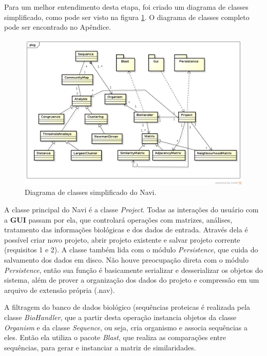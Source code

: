Para um melhor entendimento desta etapa, foi criado um diagrama de classes simplificado, como pode ser visto na figura \ref{fig:diagrama-classes-simplificado}.
O diagrama de classes completo pode ser encontrado no Apêndice.

\begin{figure}
\centering
\includegraphics[scale=0.52]{diagrama-classes-simplificado}
\caption{Diagrama de classes simplificado do Navi.}
\label{fig:diagrama-classes-simplificado}
\end{figure}

A classe principal do Navi é a classe \textit{Project}. Todas as interações do usuário com a \textbf{GUI} passam por ela, que controlará operações com
matrizes, análises, tratamento das informações biológicas e dos dados de entrada. Através dela é possível criar novo projeto, abrir projeto existente e
salvar projeto corrente (requisitos 1 e 2). A classe também lida com o módulo \textit{Persistence}, que cuida do salvamento dos dados em disco. Não houve
preocupação direta com o módulo \textit{Persistence}, então sua função é basicamente serializar e desserializar os objetos do sistema, além de prover
a organização dos dados do projeto e compressão em um arquivo de extensão própria (.nav).


A filtragem do banco de dados biológico (sequências proteicas é realizada pela classe \textit{BioHandler}, que a partir desta operação instancia objetos
da classe \textit{Organism} e da classe \textit{Sequence}, ou seja, cria organismo e associa sequências a eles. Então ela utiliza o pacote \textit{Blast},
que realiza as comparações entre sequências, para gerar e instanciar a matriz de similaridades.

